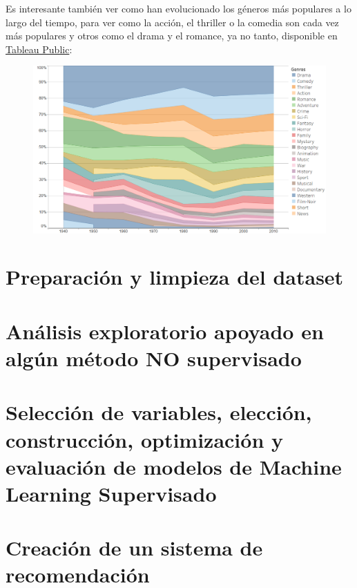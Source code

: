 \documentclass{article}
\begin{document}
Es interesante también ver como han evolucionado los géneros más populares a lo largo del tiempo, para ver como la acción, el thriller o la comedia son cada vez más populares y otros como el drama y el romance, ya no tanto, disponible en \href{https://public.tableau.com/profile/javier6580\#!/vizhome/proyecto_fin_de_master_genre/rating_genre}{Tableau Public}:

\begin{figure}[h]
\centering
\includegraphics[width=4.5in,clip,keepaspectratio]{./images/genre_year}
\end{figure}

\clearpage

\section{Preparación y limpieza del dataset}



\clearpage

\section{Análisis exploratorio apoyado en algún método NO supervisado}
\blindtext

\clearpage

\section{Selección de variables, elección, construcción, optimización y evaluación de modelos de Machine Learning Supervisado}
\blindtext

\clearpage

\section{Creación de un sistema de recomendación}
\end{document}
